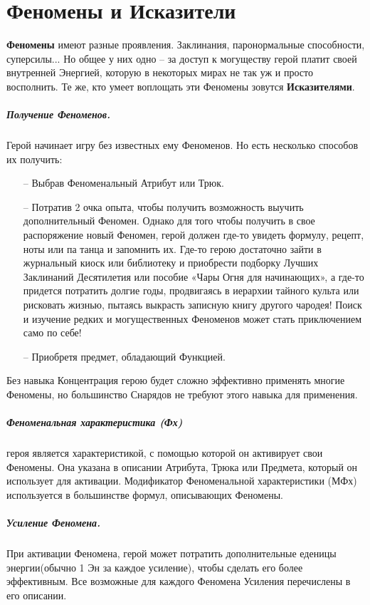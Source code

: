 \chapter{Феномены и Исказители}
\textbf{Феномены} имеют разные проявления. Заклинания, паронормальные способности, суперсилы... Но общее у них одно -- за доступ к могуществу герой платит своей внутренней Энергией, которую в некоторых мирах не так уж и просто восполнить. Те же, кто умеет воплощать эти Феномены зовутся \textbf{Исказителями}.
\paragraph{Получение Феноменов.} Герой начинает игру без известных ему Феноменов. Но есть несколько способов их получить:
\begin{itemize}
\item[--] Выбрав Феноменальный Атрибут или Трюк.
\item[--] Потратив 2 очка опыта, чтобы получить возможность выучить дополнительный Феномен.
\newline
Однако для того чтобы получить в свое распоряжение новый Феномен, герой должен где-то увидеть формулу, рецепт, ноты или па танца и запомнить их. Где-то герою достаточно зайти в журнальный киоск или библиотеку и приобрести подборку Лучших Заклинаний Десятилетия или пособие «Чары Огня для начинающих», а где-то придется потратить долгие годы, продвигаясь в иерархии тайного культа или рисковать жизнью, пытаясь выкрасть записную книгу другого чародея! Поиск и изучение редких и могущественных Феноменов может стать приключением само по себе!
\item[--] Приобретя предмет, обладающий Функцией.
\end{itemize}
\begin{tcolorbox}
Без навыка Концентрация герою будет сложно эффективно применять многие Феномены, но большинство Снарядов не требуют этого навыка для применения.
\end{tcolorbox}
\paragraph{Феноменальная характеристика (Фх)} героя является характеристикой, с помощью которой он активирует свои Феномены. Она указана в описании Атрибута, Трюка или Предмета, который он использует для активации. Модификатор Феноменальной характеристики (МФх) используется в большинстве формул, описывающих Феномены.
\paragraph{Усиление Феномена.} При активации Феномена, герой может потратить дополнительные еденицы энергии(обычно 1 Эн за каждое усиление), чтобы сделать его более эффективным. Все возможные для каждого Феномена Усиления перечислены в его описании.
